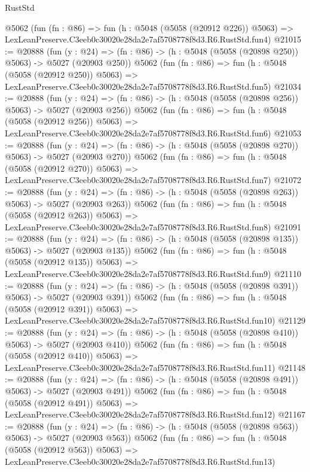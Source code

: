 \begin{lexlean}{RustStd}
\begin{coremodule}
    @5062
    (fun (fn : @86) =>
    fun (h : @5048 (@5058 (@20912 @226)) @5063) =>
    LexLeanPreserve.C3eeb0c30020e28da2e7af5708778f8d3.R6.RustStd.fun4)
@21015 := @20888
    (fun (y : @24) => (fn : @86) -> (h : @5048 (@5058 (@20898 @250)) @5063) -> @5027 (@20903 @250))
    @5062
    (fun (fn : @86) =>
    fun (h : @5048 (@5058 (@20912 @250)) @5063) =>
    LexLeanPreserve.C3eeb0c30020e28da2e7af5708778f8d3.R6.RustStd.fun5)
@21034 := @20888
    (fun (y : @24) => (fn : @86) -> (h : @5048 (@5058 (@20898 @256)) @5063) -> @5027 (@20903 @256))
    @5062
    (fun (fn : @86) =>
    fun (h : @5048 (@5058 (@20912 @256)) @5063) =>
    LexLeanPreserve.C3eeb0c30020e28da2e7af5708778f8d3.R6.RustStd.fun6)
@21053 := @20888
    (fun (y : @24) => (fn : @86) -> (h : @5048 (@5058 (@20898 @270)) @5063) -> @5027 (@20903 @270))
    @5062
    (fun (fn : @86) =>
    fun (h : @5048 (@5058 (@20912 @270)) @5063) =>
    LexLeanPreserve.C3eeb0c30020e28da2e7af5708778f8d3.R6.RustStd.fun7)
@21072 := @20888
    (fun (y : @24) => (fn : @86) -> (h : @5048 (@5058 (@20898 @263)) @5063) -> @5027 (@20903 @263))
    @5062
    (fun (fn : @86) =>
    fun (h : @5048 (@5058 (@20912 @263)) @5063) =>
    LexLeanPreserve.C3eeb0c30020e28da2e7af5708778f8d3.R6.RustStd.fun8)
@21091 := @20888
    (fun (y : @24) => (fn : @86) -> (h : @5048 (@5058 (@20898 @135)) @5063) -> @5027 (@20903 @135))
    @5062
    (fun (fn : @86) =>
    fun (h : @5048 (@5058 (@20912 @135)) @5063) =>
    LexLeanPreserve.C3eeb0c30020e28da2e7af5708778f8d3.R6.RustStd.fun9)
@21110 := @20888
    (fun (y : @24) => (fn : @86) -> (h : @5048 (@5058 (@20898 @391)) @5063) -> @5027 (@20903 @391))
    @5062
    (fun (fn : @86) =>
    fun (h : @5048 (@5058 (@20912 @391)) @5063) =>
    LexLeanPreserve.C3eeb0c30020e28da2e7af5708778f8d3.R6.RustStd.fun10)
@21129 := @20888
    (fun (y : @24) => (fn : @86) -> (h : @5048 (@5058 (@20898 @410)) @5063) -> @5027 (@20903 @410))
    @5062
    (fun (fn : @86) =>
    fun (h : @5048 (@5058 (@20912 @410)) @5063) =>
    LexLeanPreserve.C3eeb0c30020e28da2e7af5708778f8d3.R6.RustStd.fun11)
@21148 := @20888
    (fun (y : @24) => (fn : @86) -> (h : @5048 (@5058 (@20898 @491)) @5063) -> @5027 (@20903 @491))
    @5062
    (fun (fn : @86) =>
    fun (h : @5048 (@5058 (@20912 @491)) @5063) =>
    LexLeanPreserve.C3eeb0c30020e28da2e7af5708778f8d3.R6.RustStd.fun12)
@21167 := @20888
    (fun (y : @24) => (fn : @86) -> (h : @5048 (@5058 (@20898 @563)) @5063) -> @5027 (@20903 @563))
    @5062
    (fun (fn : @86) =>
    fun (h : @5048 (@5058 (@20912 @563)) @5063) =>
    LexLeanPreserve.C3eeb0c30020e28da2e7af5708778f8d3.R6.RustStd.fun13)

\end{coremodule}
\end{lexlean}
